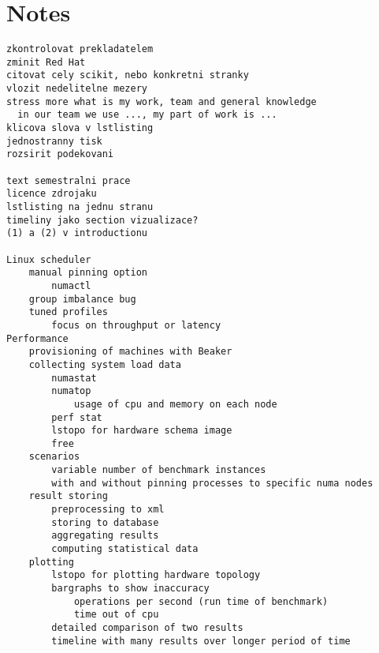 \chapter{Notes}
\begin{verbatim}
zkontrolovat prekladatelem
zminit Red Hat
citovat cely scikit, nebo konkretni stranky
vlozit nedelitelne mezery
stress more what is my work, team and general knowledge
  in our team we use ..., my part of work is ...
klicova slova v lstlisting
jednostranny tisk
rozsirit podekovani

text semestralni prace
licence zdrojaku
lstlisting na jednu stranu
timeliny jako section vizualizace?
(1) a (2) v introductionu

Linux scheduler
    manual pinning option
        numactl
    group imbalance bug
    tuned profiles
        focus on throughput or latency
Performance
    provisioning of machines with Beaker
    collecting system load data
        numastat
        numatop
            usage of cpu and memory on each node
        perf stat
        lstopo for hardware schema image
        free
    scenarios
        variable number of benchmark instances
        with and without pinning processes to specific numa nodes
    result storing
        preprocessing to xml
        storing to database
        aggregating results
        computing statistical data
    plotting
        lstopo for plotting hardware topology
        bargraphs to show inaccuracy
            operations per second (run time of benchmark)
            time out of cpu
        detailed comparison of two results
        timeline with many results over longer period of time
\end{verbatim}